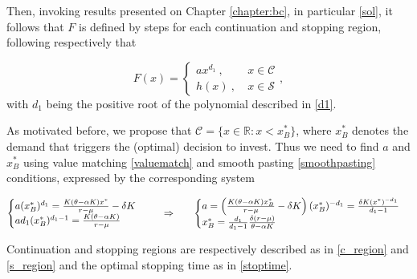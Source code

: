 Then, invoking results presented on Chapter \ref{chapter:bc}, in particular \eqref{sol}, it follows that $F$ is defined by steps for each continuation and stopping region, following respectively that

\begin{equation}
F(x)=\begin{cases} a x^{d_1}  \ , &\ x \in \mathcal{C} \\
h(x) \ , &\ x \in \mathcal{S}
\end{cases},
\label{1_F}
\end{equation}
with $d_1$ being the positive root of the polynomial described in \eqref{d1}.

As motivated before, we propose that $\mathcal{C}=\{x\in \mathds{R}:x< x_B^* \}$, where $x_B^*$ denotes the demand that triggers the (optimal) decision to invest. Thus we need to find $a$ and $x_B^*$ using value matching \eqref{valuematch} and smooth pasting \eqref{smoothpasting} conditions, expressed by the corresponding system

\begin{equation}
\begin{cases} a(x_B^*)^{d_1}=\frac{K(\theta-\alpha K) x^*}{r-\mu} - \delta K \\
ad_1(x_B^*)^{d_1-1}=\frac{K(\theta-\alpha K)}{r-\mu}
\end{cases}
\hspace{5mm} \Rightarrow \ \hspace{5mm}
\begin{cases}
a= \left( \frac{K(\theta-\alpha K) x_B^*}{r-\mu} - \delta K \right)(x_B^*)^{-d_1} = \frac{\delta K (x^*)^{-d_1}}{d_1-1}\\
x_B^*=\frac{d_1}{d_1-1} \frac{ \delta (r-\mu)}{\theta-\alpha K}
\end{cases}
\label{eq:sistema}
\end{equation}


Continuation and stopping regions are respectively described as in \eqref{c_region} and \eqref{s_region} and the optimal stopping time as in \eqref{stoptime}.


